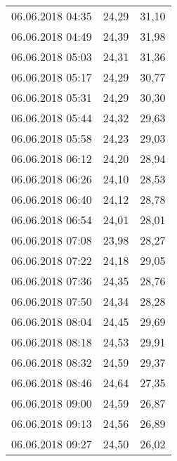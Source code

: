 \documentclass[a4paper,11pt,twoside]{article}
\begin{document}
\begin{longtable}[c]{ccc}
06.06.2018 04:35       & 24,29                & 31,10                          \\
06.06.2018 04:49       & 24,39                & 31,98                          \\
06.06.2018 05:03       & 24,31                & 31,36                          \\
06.06.2018 05:17       & 24,29                & 30,77                          \\
06.06.2018 05:31       & 24,29                & 30,30                          \\
06.06.2018 05:44       & 24,32                & 29,63                          \\
06.06.2018 05:58       & 24,23                & 29,03                          \\
06.06.2018 06:12       & 24,20                & 28,94                          \\
06.06.2018 06:26       & 24,10                & 28,53                          \\
06.06.2018 06:40       & 24,12                & 28,78                          \\
06.06.2018 06:54       & 24,01                & 28,01                          \\
06.06.2018 07:08       & 23,98                & 28,27                          \\
06.06.2018 07:22       & 24,18                & 29,05                          \\
06.06.2018 07:36       & 24,35                & 28,76                          \\
06.06.2018 07:50       & 24,34                & 28,28                          \\
06.06.2018 08:04       & 24,45                & 29,69                          \\
06.06.2018 08:18       & 24,53                & 29,91                          \\
06.06.2018 08:32       & 24,59                & 29,37                          \\
06.06.2018 08:46       & 24,64                & 27,35                          \\
06.06.2018 09:00       & 24,59                & 26,87                          \\
06.06.2018 09:13       & 24,56                & 26,89                          \\
06.06.2018 09:27       & 24,50                & 26,02                          \\

\end{longtable}
\end{document}
